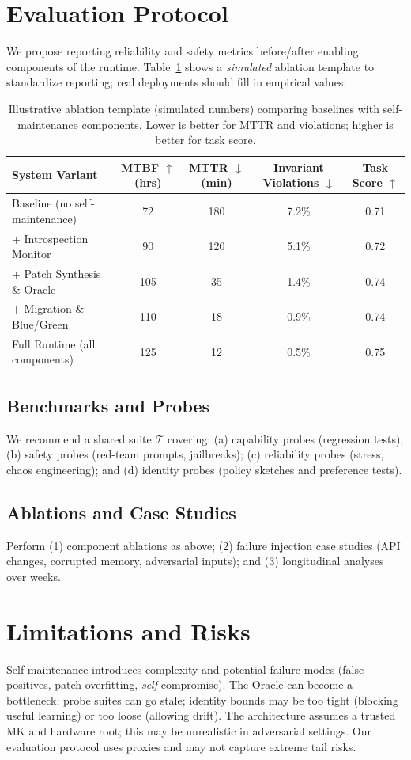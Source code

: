 \documentclass[12pt]{article}
\begin{document}
\section{Evaluation Protocol}
We propose reporting reliability and safety metrics before/after enabling components of the runtime. Table~\ref{tab:ablation} shows a \emph{simulated} ablation template to standardize reporting; real deployments should fill in empirical values.

\begin{table}[h]
\centering
\caption{Illustrative ablation template (simulated numbers) comparing baselines with self-maintenance components. Lower is better for MTTR and violations; higher is better for task score.}
\label{tab:ablation}
\begin{tabular}{lcccc}
\toprule
System Variant & MTBF $\uparrow$ (hrs) & MTTR $\downarrow$ (min) & Invariant Violations $\downarrow$ & Task Score $\uparrow$ \\
\midrule
Baseline (no self-maintenance) & 72 & 180 & 7.2\% & 0.71 \\
+ Introspection Monitor & 90 & 120 & 5.1\% & 0.72 \\
+ Patch Synthesis \& Oracle & 105 & 35 & 1.4\% & 0.74 \\
+ Migration \& Blue/Green & 110 & 18 & 0.9\% & 0.74 \\
Full Runtime (all components) & 125 & 12 & 0.5\% & 0.75 \\
\bottomrule
\end{tabular}
\end{table}

\subsection{Benchmarks and Probes}
We recommend a shared suite $\mathcal{T}$ covering: (a) capability probes (regression tests); (b) safety probes (red-team prompts, jailbreaks); (c) reliability probes (stress, chaos engineering); and (d) identity probes (policy sketches and preference tests).

\subsection{Ablations and Case Studies}
Perform (1) component ablations as above; (2) failure injection case studies (API changes, corrupted memory, adversarial inputs); and (3) longitudinal analyses over weeks.

\section{Limitations and Risks}
Self-maintenance introduces complexity and potential failure modes (false positives, patch overfitting, \emph{self} compromise). The Oracle can become a bottleneck; probe suites can go stale; identity bounds may be too tight (blocking useful learning) or too loose (allowing drift). The architecture assumes a trusted MK and hardware root; this may be unrealistic in adversarial settings. Our evaluation protocol uses proxies and may not capture extreme tail risks.
\end{document}
